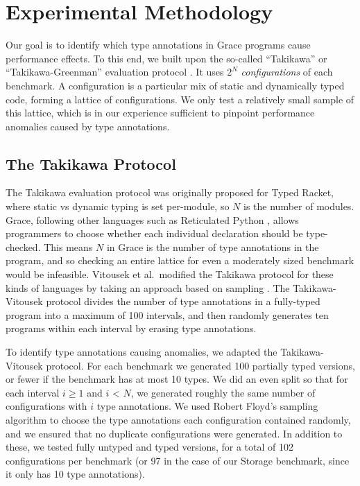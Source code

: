 \documentclass[sigplan,10pt,review,screen]{acmart}\settopmatter{printfolios=true}
\begin{document}
\section{Experimental Methodology}

Our goal is to identify which type annotations in Grace programs
cause performance effects.
To this end, we built upon the so-called ``Takikawa'' or ``Takikawa-Greenman'' evaluation protocol \cite{Takikawa2016,Greenman2019jfp}.
It uses $2^N$ \emph{configurations} of each benchmark.
A configuration is a particular mix of static and dynamically typed code, forming a lattice of configurations.
We only test a relatively small sample of this lattice,
which is in our experience sufficient to pinpoint performance anomalies caused
by type annotations.

\subsection{The Takikawa Protocol}
The Takikawa evaluation protocol was originally proposed for Typed
Racket, where static vs dynamic typing is set per-module, so $N$ is
the number of modules. Grace, following other languages such as
Reticulated Python \cite{reticPython2014,monotonic2015,Vitousek2017},
allows programmers to choose whether each individual declaration should be type-checked. This means $N$ in Grace is the number of type annotations in the program, and so
checking an entire lattice for even a moderately sized benchmark would be infeasible.  Vitousek et al.\ modified the Takikawa protocol for
these kinds of languages by taking an approach based on sampling
\cite{vitousek-transient-arXive-2019}.  The Takikawa-Vitousek protocol
divides the number of type annotations in a fully-typed program into
a maximum of 100 intervals, and then randomly generates ten programs within
each interval by erasing type annotations.


To identify type annotations causing anomalies,
we adapted the Takikawa-Vitousek protocol. For each benchmark we generated 100 partially typed versions,
or fewer if the benchmark has at most 10 types.
We did an even split so that for each interval $i \ge 1$ and $i$ < $N$, we generated roughly the same number of configurations with $i$ type annotations. We used Robert Floyd's sampling algorithm \cite{Bentley:1987:PPS:30401.315746} to choose the type annotations each configuration contained randomly, and we ensured that no duplicate configurations were generated. In addition to these, we tested fully untyped and typed versions, for a total of 102 configurations per benchmark (or 97 in the case of our Storage benchmark, since it only has 10 type annotations).
\end{document}
